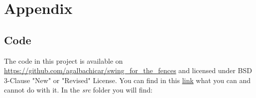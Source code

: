 \section{Appendix}
\label{sec:appendix}

\subsection{Code}
\label{sec:appendix_code}

The code in this project is available on \href{https://github.com/agalbachicar/swing_for_the_fences}{https://github.com/agalbachicar/swing\_for\_the\_fences} and licensed under BSD 3-Clause "New" or "Revised" License. You can 
find in this \href{https://tldrlegal.com/license/bsd-3-clause-license-(revised)}{link}
what you can and cannot do with it. In the \emph{src} folder you will find:


